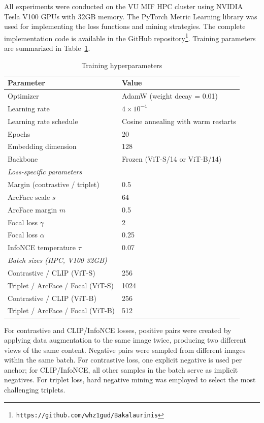 \documentclass[
    english,
]{VUMIFPSbakalaurinis}
\begin{document}
All experiments were conducted on the VU MIF HPC cluster using NVIDIA Tesla V100 GPUs with 32GB memory. The PyTorch Metric Learning library \cite{Mus20} was used for implementing the loss functions and mining strategies. The complete implementation code is available in the GitHub repository\footnote{\texttt{https://github.com/whz1gud/Bakalaurinis}}. Training parameters are summarized in Table~\ref{tab:training}.

\begin{table}[H]
\centering
\caption{Training hyperparameters}
\label{tab:training}
\begin{tabular}{ll}
\toprule
\textbf{Parameter} & \textbf{Value} \\
\midrule
Optimizer & AdamW (weight decay = 0.01) \\
Learning rate & $4 \times 10^{-4}$ \\
Learning rate schedule & Cosine annealing with warm restarts \\
Epochs & 20 \\
Embedding dimension & 128 \\
Backbone & Frozen (ViT-S/14 or ViT-B/14) \\
\midrule
\multicolumn{2}{l}{\textit{Loss-specific parameters}} \\
Margin (contrastive / triplet) & 0.5 \\
ArcFace scale $s$ & 64 \\
ArcFace margin $m$ & 0.5 \\
Focal loss $\gamma$ & 2 \\
Focal loss $\alpha$ & 0.25 \\
InfoNCE temperature $\tau$ & 0.07 \\
\midrule
\multicolumn{2}{l}{\textit{Batch sizes (HPC, V100 32GB)}} \\
Contrastive / CLIP (ViT-S) & 256 \\
Triplet / ArcFace / Focal (ViT-S) & 1024 \\
Contrastive / CLIP (ViT-B) & 256 \\
Triplet / ArcFace / Focal (ViT-B) & 512 \\
\bottomrule
\end{tabular}
\end{table}

For contrastive and CLIP/InfoNCE losses, positive pairs were created by applying data augmentation to the same image twice, producing two different views of the same content. Negative pairs were sampled from different images within the same batch. For contrastive loss, one explicit negative is used per anchor; for CLIP/InfoNCE, all other samples in the batch serve as implicit negatives. For triplet loss, hard negative mining was employed to select the most challenging triplets.
\end{document}
